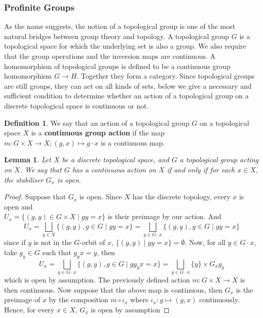\documentclass{article}
\theoremstyle{plain}
\newtheorem{lemma}[theorem]{Lemma}
\theoremstyle{definition}
\newtheorem{definition}[theorem]{Definition}
\begin{document}
\subsubsection{Profinite Groups}


As the name suggests, the notion of a topological group is one of the most natural bridges between group theory and topology.
A topological group $G$ is a topological space for which the underlying set is also a group. We also require that the group operations and the inversion maps are continuous.
A homomorphism of topological groups is defined to be a continuous group homomorphism $G\rightarrow H$.
Together they form a category.
Since topological groups are still groups, they can act on all kinds of sets, below we give a necessary and sufficient condition to determine whether an action of a topological group on a discrete topological space is continuous or not.

\begin{definition}
    We say that an action of a topological group $G$ on a topological space $X$ is a \textbf{continuous group action} if the map $m :G\times X\rightarrow X ; (g,x) \mapsto g\cdot x$ is a continuous map.
\end{definition}

\begin{lemma}
\label{continuous_open_stabiliser}
    Let $X$ be a discrete topological space, and $G$ a topological group acting on $X$. We say that $G$ has a continuous action on $X$ if and only if for each $x\in X$, the stabiliser $G_x$ is open.
\end{lemma}
\begin{proof}
    Suppose that $G_x$ is open. 
    Since $X$ has the discrete topology, every $x$ is open and\\
    $U_x = \{(g,y)\in G\times X \mid gy=x\}$ is their preimage by our action.
    And
    \begin{equation*}
        U_x = \bigsqcup_{y\in X} \{(g,y), g\in G\mid gy = x\}
            = \bigsqcup_{y\in G\cdot x}\{(g,y), g\in G\mid gy=x\}
    \end{equation*}
    since if $y$ is not in the $G$-orbit of $x$, $\{(g,y) \mid gy = x\} = \emptyset$.
    Now, for all $y\in G\cdot x$, take $g_y\in G$ such that $g_yx = y$, then 
    \begin{equation*}
        U_x  = \bigsqcup_{y\in G\cdot x} \{ (g,y), g\in G\mid gg_yx=x\}
            = \bigsqcup_{y\in G\cdot x} \{y\} \times G_x g_y
    \end{equation*}
    which is open by assumption. The previously defined action $m:G\times X\rightarrow X$ is then continuous.
    Now suppose that the above map is continuous, then $G_x$ is the preimage of $x$ by the composition $m\circ \iota_x$ where $\iota_x : g\mapsto  (g,x)$ continuously.
    Hence, for every $x\in X$, $G_x$ is open by assumption
\end{proof}
\end{document}
